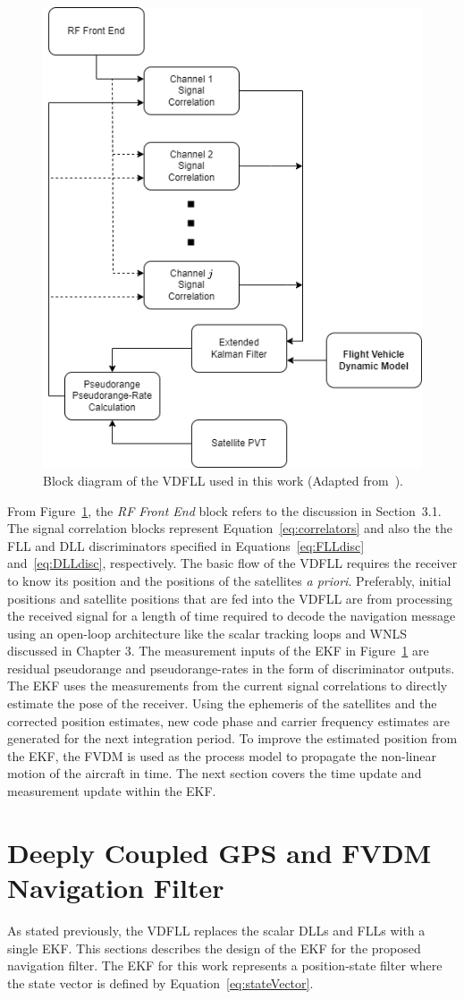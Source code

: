 \begin{figure}[!ht]
    \centering
    \includegraphics[width=0.45\linewidth]{Figures/VectorTracking.drawio.png}
    \caption{Block diagram of the VDFLL used in this work (Adapted from~\cite{grierPositionNavigationTiming}).}\label{fig:VDFLL}
\end{figure}

From Figure~\ref{fig:VDFLL}, the \textit{RF Front End} block refers to the discussion in Section~3.1. The signal correlation blocks represent Equation~\ref{eq:correlators} and also the the FLL and DLL discriminators specified in Equations~\ref{eq:FLLdisc} and~\ref{eq:DLLdisc}, respectively. The basic flow of the VDFLL requires the receiver to know its position and the positions of the satellites \textit{a priori}. Preferably, initial positions and satellite positions that are fed into the VDFLL are from processing the received signal for a length of time required to decode the navigation message using an open-loop architecture like the scalar tracking loops and WNLS discussed in Chapter 3. The measurement inputs of the EKF in Figure~\ref{fig:VDFLL} are residual pseudorange and pseudorange-rates in the form of discriminator outputs. The EKF uses the measurements from the current signal correlations to directly estimate the pose of the receiver. Using the ephemeris of the satellites and the corrected position estimates, new code phase and carrier frequency estimates are generated for the next integration period. To improve the estimated position from the EKF, the FVDM is used as the process model to propagate the non-linear motion of the aircraft in time. The next section covers the time update and measurement update within the EKF\@.

\section{\textbf{Deeply Coupled GPS and FVDM Navigation Filter}}
As stated previously, the VDFLL replaces the scalar DLLs and FLLs with a single EKF\@. This sections describes the design of the EKF for the proposed navigation filter. The EKF for this work represents a position-state filter where the state vector is defined by Equation~\ref{eq:stateVector}.

